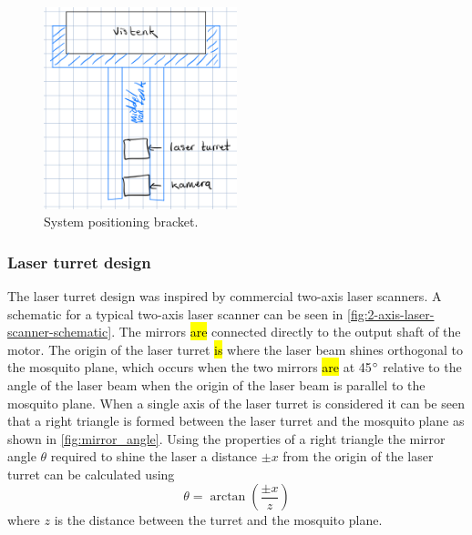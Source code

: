 \begin{figure}[h]
    \centering
    \includegraphics[width=0.5\textwidth]{figures/positioning_bracket.png}
    \caption{System positioning bracket.}
    \label{fig:system_positioning_bracket}
\end{figure}

\subsubsection{Laser turret design}

The laser turret design was inspired by commercial two-axis laser scanners. A schematic for a typical two-axis laser scanner can be seen in \autoref{fig:2-axis-laser-scanner-schematic}. The mirrors \hl{are} connected directly to the output shaft of the motor. The origin of the laser turret \hl{is} where the laser beam shines orthogonal to the mosquito plane, which occurs when the two mirrors \hl{are} at 45$^{\circ}$ relative to the angle of the laser beam when the origin of the laser beam is parallel to the mosquito plane. When a single axis of the laser turret is considered it can be seen that a right triangle is formed between the laser turret and the mosquito plane as shown in \autoref{fig:mirror_angle}. Using the properties of a right triangle the mirror angle $\theta$ required to shine the laser a distance $\pm x$ from the origin of the laser turret can be calculated using
\begin{equation}
    \theta = \arctan{\left(\frac{\pm x}{z}\right)}
    \label{eq:mirror_angle}
\end{equation}
where $z$ is the distance between the turret and the mosquito plane.

